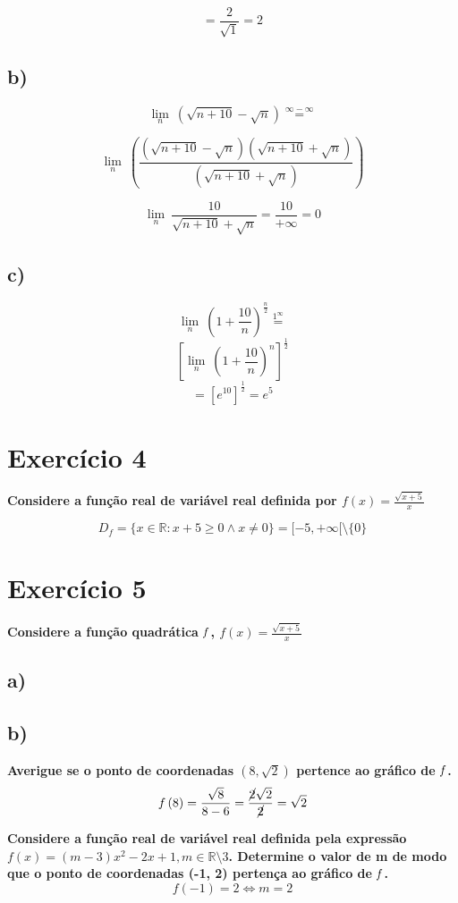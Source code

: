 \documentclass[a4paper]{article}
\begin{document}
	\[= \frac{2}{\sqrt{1}}=2\]
	
	\subsection*{b)}
	\[\lim\limits_{n}\ \left(\sqrt{n+10}-\sqrt{n}\right)\overset{\mathrm{\infty-\infty}}{=}\]
	
	\[\lim\limits_{n}\ \left(\frac{\left(\sqrt{n+10}-\sqrt{n}\right)\left(\sqrt{n+10}+\sqrt{n}\right)}{\left(\sqrt{n+10}+\sqrt{n}\right)}\right)\]
	
	\[\lim\limits_{n}\ \frac{10}{\sqrt{n+10}+\sqrt{n}} = \frac{10}{+\infty}=0\]
	
	\subsection*{c)}
	\[\lim\limits_{n}\ \left(1+\frac{10}{n}\right)^{\frac{n}{2}}\overset{\mathrm{1^{\infty}}}{=}\]
	\[\left[\lim\limits_{n}\ \left(1+\frac{10}{n}\right)^{n}\right]^{\frac{1}{2}}\]
	\[= \left[e^{10}\right]^{\frac{1}{2}}= e^{5}\]
	
	\section*{Exercício 4}
	\textbf{Considere a função real de variável real definida por $f(x) = \frac{\sqrt{x+5}}{x}$}
	
	\[D_{f}=\{x \in \mathbb{R}:x + 5\geq 0 \land x \neq 0 \}=[-5,+\infty[\setminus\{0\}\]
	\section*{Exercício 5}
	\textbf{Considere a função quadrática $\it{f}$, $f(x) = \frac{\sqrt{x+5}}{x}$}
		\subsection*{a)}
	\subsection*{b)}
	\textbf{Averigue se o ponto de coordenadas $\left(8,\sqrt{2}\right)$ pertence ao gráfico de $\it{f}$.}
	\[f\left(8\right)=\frac{\sqrt{8}}{8-6}=\frac{\cancel{2}\sqrt{2}}{\cancel{2}}=\sqrt{2}\]
	
	\textbf{Considere a função real de variável real definida pela expressão
		$f(x) = (m-3)x^2 - 2x + 1, m \in \mathbb{R} \setminus {3}$. Determine o valor de m de modo que o ponto de coordenadas (-1, 2) pertença ao gráfico de $\it{f}$.}
	\[f(-1)=2 \Leftrightarrow m=2\]
	
\end{document}
